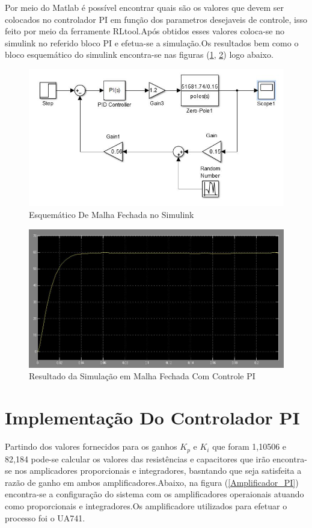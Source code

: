\documentclass[11pt, a4paper, oneside]{article}
\begin{document}
Por meio do Matlab é possível encontrar quais são os valores que devem ser colocados no controlador PI em função dos parametros desejaveis de controle, isso feito por meio da ferramente RLtool.Após obtidos esses valores coloca-se no simulink no referido bloco PI e efetua-se a simulação.Os resultados bem como o bloco esquemático do simulink encontra-se nas figuras (\ref{Malha_fechada_simulink}, \ref{Simulacao_malha_fechadaPI}) logo abaixo.

\begin{figure}[h!]
\centering
\includegraphics[width=.7\linewidth]{Malha_fechada_simulink.jpg}
\caption{Esquemático De Malha Fechada no Simulink}	
\label{Malha_fechada_simulink}
\end{figure}

\begin{figure}[h!]
\centering
\includegraphics[width=.7\linewidth]{simulacao_malha_fechada.jpg}
\caption{Resultado da Simulação em Malha Fechada Com Controle PI}	
\label{Simulacao_malha_fechadaPI}
\end{figure}

\section{Implementação Do Controlador PI}
Partindo dos valores fornecidos para os ganhos $K_p$ e $K_i$ que foram 1,10506 e 82,184 pode-se calcular os valores das resistências e capacitores que irão encontra-se nos amplicadores proporcionais e integradores, basntando que seja satisfeita a razão de ganho em ambos amplificadores.Abaixo, na figura (\ref{Amplificador_PI}) encontra-se a configuração do sistema com os amplificadores operaionais atuando como proporcionais e integradores.Os amplificadore utilizados para efetuar o processo foi o UA741.
\end{document}
